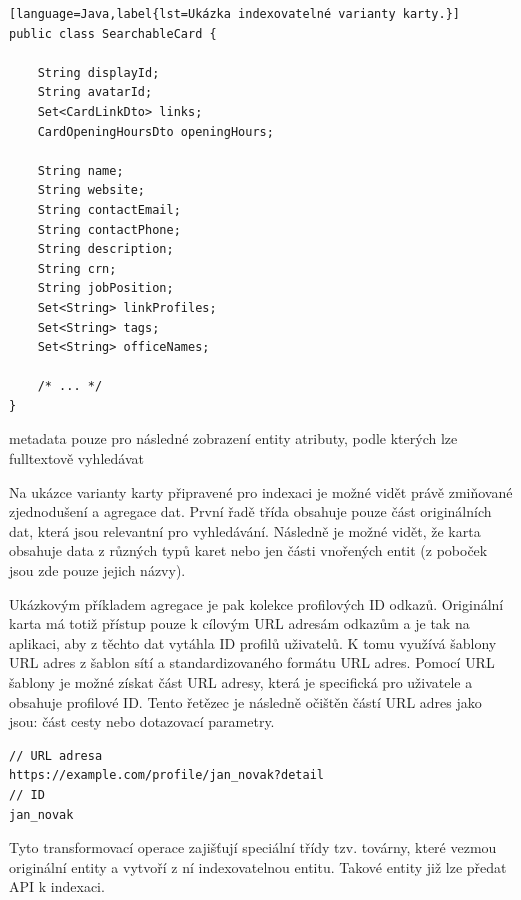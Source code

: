 		\begin{lstlisting}[language=Java,label{lst=Ukázka indexovatelné varianty karty.}]
public class SearchableCard {

    String displayId;
    String avatarId;
    Set<CardLinkDto> links;
    CardOpeningHoursDto openingHours;

    String name;
    String website;
    String contactEmail;
    String contactPhone;
    String description;
    String crn;
    String jobPosition;
    Set<String> linkProfiles;
    Set<String> tags;
    Set<String> officeNames;

    /* ... */
}
		\end{lstlisting}

metadata pouze pro následné zobrazení entity
atributy, podle kterých lze fulltextově vyhledávat

		Na ukázce varianty karty připravené pro indexaci je možné vidět právě zmiňované zjednodušení a agregace dat.
		První řadě třída obsahuje pouze část originálních dat, která jsou relevantní pro vyhledávání.
		Následně je možné vidět, že karta obsahuje data z různých typů karet nebo jen části vnořených entit (z poboček jsou
		zde pouze jejich názvy).

		Ukázkovým příkladem agregace je pak kolekce profilových ID odkazů.
		Originální karta má totiž přístup pouze k cílovým \ac{URL} adresám odkazům a je tak na aplikaci, aby z těchto dat
		vytáhla ID profilů uživatelů.
		K tomu využívá šablony \ac{URL} adres z šablon sítí a standardizovaného formátu \ac{URL} adres.
		Pomocí \ac{URL} šablony je možné získat část \ac{URL} adresy, která je specifická pro uživatele a obsahuje profilové ID.
		Tento řetězec je následně očištěn částí \ac{URL} adres jako jsou: část cesty nebo dotazovací parametry.

		\begin{lstlisting}[label={lst=Ukázka transformace URL adresy na profilové ID.}]
// URL adresa
https://example.com/profile/jan_novak?detail
// ID
jan_novak
		\end{lstlisting}

		Tyto transformovací operace zajišťují speciální třídy tzv. továrny, které vezmou originální entity a vytvoří
		z ní indexovatelnou entitu.
		Takové entity již lze předat \ac{API} k indexaci.

